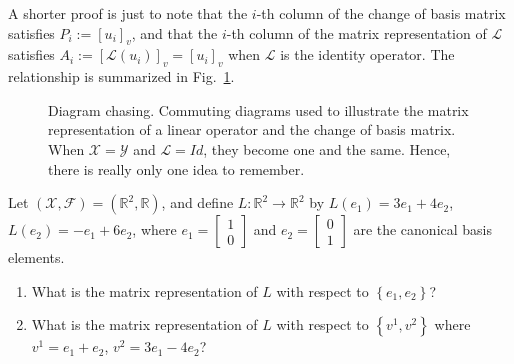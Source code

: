     \Qed

    
\begin{rem} A shorter proof is just to note that the $i$-th column of the change of basis matrix satisfies $P_i:=[u_i]_v$, and that the $i$-th column of the matrix representation of $\mathcal{L}$ satisfies $A_i:=[\mathcal{L}(u_i)]_v =[u_i]_v$ when $\mathcal{L}$ is the identity operator. The relationship is summarized in Fig.~\ref{fig:DiagramChasing}.
\end{rem}
    
   \begin{figure}[hbt!]%
\centering
{}%
\hspace{5pt}%
%
    \caption[]{Diagram chasing. Commuting diagrams used to illustrate the matrix representation of a linear operator and the change of basis matrix. When $\mathcal{X}=\mathcal{Y}$ and $\mathcal{L}=Id$, they become one and the same. Hence, there is really only one idea to remember.}
    \label{fig:DiagramChasing}
\end{figure} 

\vspace*{.2in}

\begin{example}
Let $\left(\mathcal{X},\mathcal{F}\right)=\left({\mathbb R}^{2},{\mathbb R}\right)$,
and define $L:{\mathbb R}^{2}\rightarrow{\mathbb R}^{2}$ by $L\left(e_{1}\right)=3e_{1}+4e_{2}$,
$L\left(e_{2}\right)=-e_{1}+6e_{2}$, where $e_{1}=\begin{bmatrix}1\\
0
\end{bmatrix}$ and $e_{2}=\begin{bmatrix}0\\
1
\end{bmatrix}$ are the canonical basis elements.
\begin{enumerate}
            \renewcommand{\labelenumi}{(\alph{enumi})}
        \setlength{\itemsep}{.1cm}
\item What is the matrix representation of $L$ with respect to $\left\{ e_{1},e_{2}\right\} $?
\item What is the matrix representation of $L$ with respect to $\left\{ v^{1},v^{2}\right\} $
where $v^{1}=e_{1}+e_{2}$, $v^{2}=3e_{1}-4e_{2}$?
\end{enumerate}
    
    \end{example}

